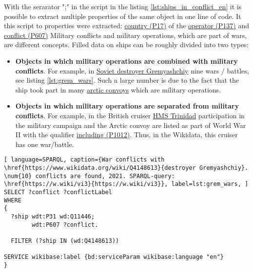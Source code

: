 With the serarator ";" in the script in the listing \ref{lst:ships_in_conflict_en} it is possible to extract multiple properties of the same object in one line of code. It this script to properties were extracted: \href{https://www.wikidata.org/wiki/Property:P17}{country (P17)} of the \href{https://www.wikidata.org/wiki/Property:P137}{operator (P137)} and \href{https://www.wikidata.org/wiki/Property:P607}{conflict (P607)} Military conflicts and military operations, which are part of wars, are different concepts. Filled data on ships can be roughly divided into two types:

\begin{itemize}
  \item \textbf{Objects in which military operations are combined with military conflicts}. For example, in \href{https://www.wikidata.org/wiki/Q4148613}{Soviet destroyer Gremyashchiy} nine wars / battles, see listing \ref{lst:grem_wars}. Such a large number is due to the fact that the ship took part in many \href{https://en.wikipedia.org/wiki/Arctic_convoys_of_World_War_II}{arctic convoys} which are military operations.

\label{question:ship_2}

  \item \textbf{Objects in which military operations are separated from military conflicts}. For example, in the British cruiser \href{https://en.wikipedia.org/wiki/HMS_Trinidad_(1940)}{HMS Trinidad} participation in the military campaign and the Arctic convoy are listed as part of World War II with the qualifier \href{https://www.wikidata.org/wiki/Property:P1012}{including (P1012)}. Thus, in the Wikidata, this cruiser has one war/battle.
\end{itemize}


\begin{lstlisting}[ language=SPARQL, caption={War conflicts with \href{https://www.wikidata.org/wiki/Q4148613}{destroyer Gremyashchiy}. \num{10} conflicts are found, 2021. SPARQL-query: \href{https://w.wiki/vi3}{https://w.wiki/vi3}}, label=lst:grem_wars, ]
SELECT ?conflict ?conflictLabel
WHERE
{
  ?ship wdt:P31 wd:Q11446;
        wdt:P607 ?conflict.
      
  FILTER (?ship IN (wd:Q4148613))
                
SERVICE wikibase:label {bd:serviceParam wikibase:language "en"}
}
\end{lstlisting}


